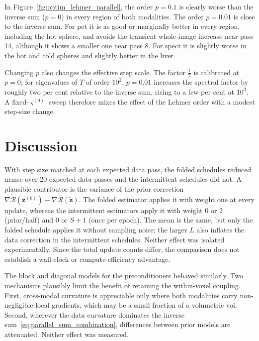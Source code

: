 In Figure~\ref{fig:optim_lehmer_parallel}, the order $p=0.1$ is clearly worse than the inverse sum ($p=0$) in every region of both modalities. The order $p=0.01$ is close to the inverse sum. For \gls{pet} it is as good or marginally better in every region, including the hot sphere, and avoids the transient whole-image increase near pass 14, although it shows a smaller one near pass 8. For \gls{spect} it is slightly worse in the hot and cold spheres and slightly better in the liver.

Changing $p$ also changes the effective step scale. The factor $\tfrac12$ is calibrated at $p=0$; for eigenvalues of $T$ of order $10^2$, $p=0.01$ increases the spectral factor by roughly two per cent relative to the inverse sum, rising to a few per cent at $10^3$. A fixed-$\varsigma^{(0)}$ sweep therefore mixes the effect of the Lehmer order with a modest step-size change.

\section{Discussion}
\label{sec:optimisation_discussion}

With step size matched at each expected data pass, the folded schedules reduced \gls{nrmse} over 20 expected data passes and the intermittent schedules did not. A plausible contributor is the variance of the prior correction $\nabla\widetilde{\mathcal R}(\bm z^{(k)})-\nabla\widetilde{\mathcal R}(\widetilde{\bm z})$. The folded estimator applies it with weight one at every update, whereas the intermittent estimators apply it with weight $0$ or $2$ (prior/half) and $0$ or $S+1$ (once per epoch). The mean is the same, but only the folded schedule applies it without sampling noise; the larger $L$ also inflates the data correction in the intermittent schedules. Neither effect was isolated experimentally. Since the total update counts differ, the comparison does not establish a wall-clock or compute-efficiency advantage.

The block and diagonal models for the preconditioners behaved similarly. Two mechanisms plausibly limit the benefit of retaining the within-voxel coupling. First, cross-modal curvature is appreciable only where both modalities carry non-negligible local gradients, which may be a small fraction of a volumetric \gls{voi}. Second, wherever the data curvature dominates the inverse sum~\eqref{eq:parallel_sum_combination}, differences between prior models are attenuated. Neither effect was measured.

